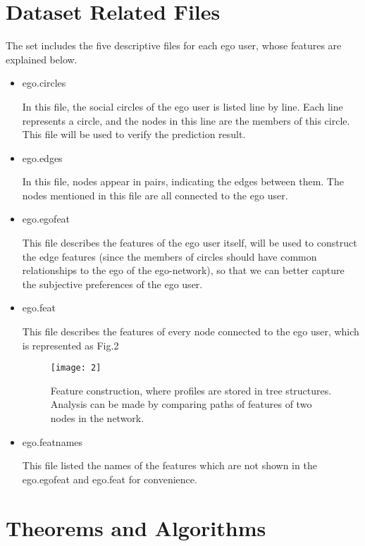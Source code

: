 \documentclass[12pt,a4paper]{article}
\begin{document}
\section*{Dataset Related Files}
\par The set includes the five descriptive files for each ego user, whose features are explained below.
\begin{itemize}
    \item ego.circles
    \par In this file, the social circles of the ego user is listed line by line. Each line represents a circle, and the nodes in this line are the members of this circle. This file will be used to verify the prediction result.
    \item ego.edges
    \par In this file, nodes appear in pairs, indicating the edges between them. The nodes mentioned in this file are all connected to the ego user.
    \item ego.egofeat
    \par This file describes the features of the ego user itself, will be used to construct the edge features (since the members of circles should have common relationships to the ego of the ego-network), so that we can better capture the subjective preferences of the ego user.
    \item ego.feat
    \par This file describes the features of every node connected to the ego user, which is represented as Fig.2
    \begin{figure}[H]
        \centering
        \texttt{[image: 2]}
        \caption{Feature construction, where profiles are stored in tree structures. Analysis can be made by comparing paths of features of two nodes in the network.}
        \label{fig2}
    \end{figure}
    \item ego.featnames
    \par This file listed the names of the features which are not shown in the ego.egofeat and ego.feat for convenience.

\end{itemize}

\section*{Theorems and Algorithms}
\end{document}
